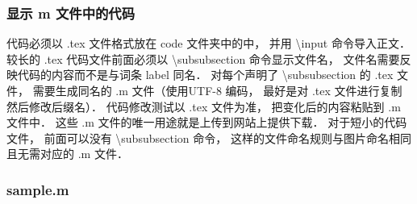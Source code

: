 \subsubsection{显示 m 文件中的代码}

代码必须以  .tex 文件格式放在 code 文件夹中的中， 并用 \textbackslash input 命令导入正文． 较长的 .tex 代码文件前面必须以 \textbackslash subsubsection 命令显示文件名， 文件名需要反映代码的内容而不是与词条 label 同名． 对每个声明了 \textbackslash subsubsection 的 .tex 文件， 需要生成同名的 .m 文件（使用UTF-8 编码， 最好是对 .tex 文件进行复制然后修改后缀名）． 代码修改测试以 .tex 文件为准， 把变化后的内容粘贴到 .m 文件中． 这些 .m 文件的唯一用途就是上传到网站上提供下载． 对于短小的代码文件， 前面可以没有 \textbackslash subsubsection 命令， 这样的文件命名规则与图片命名相同且无需对应的 .m 文件．

\subsubsection{sample.m}



